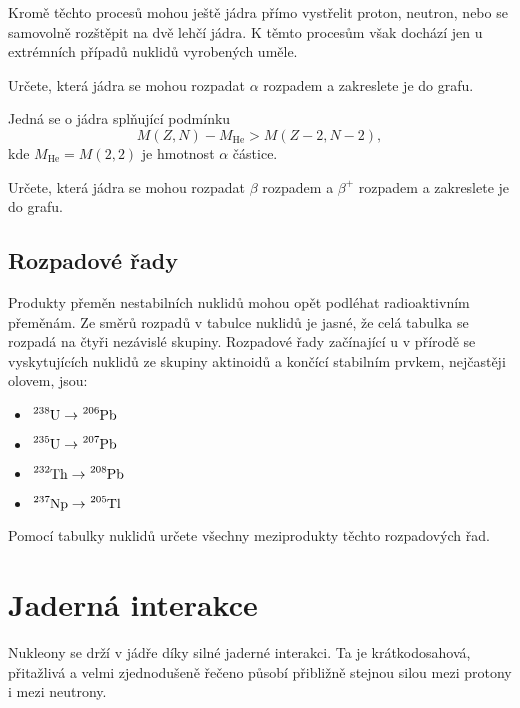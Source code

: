 \documentclass[a4paper,12pt,oneside]{article}
\theoremstyle{red}
\begin{document}
    Kromě těchto procesů mohou ještě jádra přímo vystřelit proton, neutron, nebo se samovolně rozštěpit na dvě lehčí jádra.
    K těmto procesům však dochází jen u extrémních případů nuklidů vyrobených uměle.

    \begin{task}
        Určete, která jádra se mohou rozpadat $\alpha$ rozpadem a zakreslete je do grafu.
    \end{task}
    Jedná se o jádra splňující podmínku
    \begin{equation}
        M(Z, N)-M_{\mathrm{He}}>M(Z-2,N-2),
    \end{equation}
    kde $M_{\mathrm{He}}=M(2,2)$ je hmotnost $\alpha$ částice.

    \begin{task}
        Určete, která jádra se mohou rozpadat $\beta$ rozpadem a $\beta^{+}$ rozpadem a zakreslete je do grafu.
    \end{task}
    
\subsection{Rozpadové řady}
    Produkty přeměn nestabilních nuklidů mohou opět podléhat radioaktivním přeměnám.
    Ze směrů rozpadů v tabulce nuklidů je jasné, že celá tabulka se rozpadá na čtyři nezávislé skupiny.
    Rozpadové řady začínající u v přírodě se vyskytujících nuklidů ze skupiny aktinoidů a končící stabilním prvkem, nejčastěji olovem, jsou:
    \begin{itemize}
        \item $\ce{^{238}U}\rightarrow\ce{^{206}Pb}$
        \item $\ce{^{235}U}\rightarrow\ce{^{207}Pb}$
        \item $\ce{^{232}Th}\rightarrow\ce{^{208}Pb}$
        \item $\ce{^{237}Np}\rightarrow\ce{^{205}Tl}$
    \end{itemize}
    \begin{task}
        Pomocí tabulky nuklidů určete všechny meziprodukty těchto rozpadových řad.
    \end{task}

\section{Jaderná interakce}
    Nukleony se drží v jádře díky silné jaderné interakci. 
    Ta je krátkodosahová, přitažlivá a velmi zjednodušeně řečeno působí přibližně stejnou silou mezi protony i mezi neutrony.
    
\end{document}

